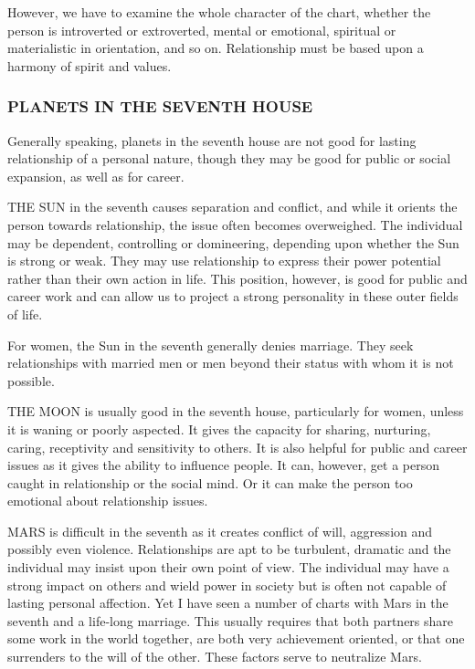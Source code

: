 However, we have to examine the whole character of the chart, whether the person is introverted or extroverted, mental or emotional, spiritual or materialistic in orientation, and so on. Relationship must be based upon a harmony of spirit and values.

 

\subsubsection{PLANETS IN THE SEVENTH HOUSE}
Generally speaking, planets in the seventh house are not good for lasting relationship of a personal nature, though they may be good for public or social expansion, as well as for career.

 

THE SUN in the seventh causes separation and conflict, and while it orients the person towards relationship, the issue often becomes overweighed. The individual may be dependent, controlling or domineering, depending upon whether the Sun is strong or weak. They may use relationship to express their power potential rather than their own action in life. This position, however, is good for public and career work and can allow us to project a strong personality in these outer fields of life.

For women, the Sun in the seventh generally denies marriage. They seek relationships with married men or men beyond their status with whom it is not possible.

 

THE MOON is usually good in the seventh house, particularly for women, unless it is waning or poorly aspected. It gives the capacity for sharing, nurturing, caring, receptivity and sensitivity to others. It is also helpful for public and career issues as it gives the ability to influence people. It can, however, get a person caught in relationship or the social mind. Or it can make the person too emotional about relationship issues.

 

MARS is difficult in the seventh as it creates conflict of will, aggression and possibly even violence. Relationships are apt to be turbulent, dramatic and the individual may insist upon their own point of view. The individual may have a strong impact on others and wield power in society but is often not capable of lasting personal affection. Yet I have seen a number of charts with Mars in the seventh and a life-long marriage. This usually requires that both partners share some work in the world together, are both very achievement oriented, or that one surrenders to the will of the other. These factors serve to neutralize Mars.

